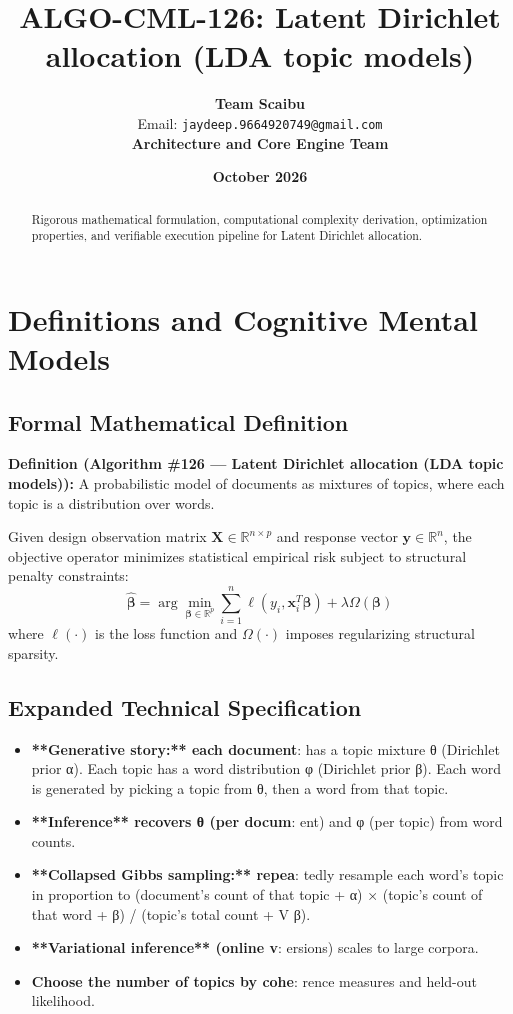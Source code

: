 \documentclass[11pt,a4paper]{article}
\title{\textbf{ALGO-CML-126: Latent Dirichlet allocation (LDA topic models)}}
\author{\textbf{Team Scaibu} \\ \small Email: \texttt{jaydeep.9664920749@gmail.com} \\ \small \textbf{Architecture and Core Engine Team}}
\date{\textbf{October 2026}}
\theoremstyle{definition}
\begin{document}
\maketitle

\begin{abstract}
Rigorous mathematical formulation, computational complexity derivation, optimization properties, and verifiable execution pipeline for Latent Dirichlet allocation.
\end{abstract}

\section{Definitions and Cognitive Mental Models}

\subsection{Formal Mathematical Definition}
\textbf{Definition (Algorithm \#126 --- Latent Dirichlet allocation (LDA topic models)):}
A probabilistic model of documents as mixtures of topics, where each topic is a distribution over words.

Given design observation matrix $\mathbf{X} \in \mathbb{R}^{n \times p}$ and response vector $\mathbf{y} \in \mathbb{R}^n$, the objective operator minimizes statistical empirical risk subject to structural penalty constraints:
\begin{equation}
\hat{\boldsymbol{\beta}} = \arg\min_{\boldsymbol{\beta} \in \mathbb{R}^p} \sum_{i=1}^n \ell(y_i, \mathbf{x}_i^T \boldsymbol{\beta}) + \lambda \Omega(\boldsymbol{\beta})
\end{equation}
where $\ell(\cdot)$ is the loss function and $\Omega(\cdot)$ imposes regularizing structural sparsity.

\subsection{Expanded Technical Specification}
\begin{itemize}
\item \textbf{**Generative story:** each document}:  has a topic mixture θ (Dirichlet prior α). Each topic has a word distribution φ (Dirichlet prior β). Each word is generated by picking a topic from θ, then a word from that topic.
\item \textbf{**Inference** recovers θ (per docum}: ent) and φ (per topic) from word counts.
\item \textbf{**Collapsed Gibbs sampling:** repea}: tedly resample each word's topic in proportion to (document's count of that topic + α) × (topic's count of that word + β) / (topic's total count + V β).
\item \textbf{**Variational inference** (online v}: ersions) scales to large corpora.
\item \textbf{Choose the number of topics by cohe}: rence measures and held-out likelihood.
\end{itemize}
\end{document}
